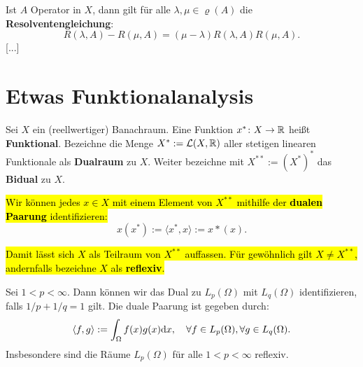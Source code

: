 \begin{bem}
Ist $A$ Operator in $X$, dann gilt für alle $\lambda,\mu\in \varrho(A)$ die \textbf{Resolventengleichung}:
\begin{equation*}
R(\lambda, A)-R(\mu, A)=(\mu-\lambda)R(\lambda, A) R(\mu, A).
\end{equation*}
[...]
\end{bem}



\section{Etwas Funktionalanalysis}




\begin{defi}
Sei $X$ ein (reellwertiger) Banachraum. Eine Funktion $x^*\colon X\to \mathbb{R}$ heißt \textbf{Funktional}. Bezeichne die Menge $X^*:=\mathcal L(X,\mathbb{R})$ aller stetigen linearen Funktionale als  \textbf{Dualraum} zu $X$. Weiter bezeichne mit $X^{**}:=(X^*)^*$ das \textbf{Bidual} zu $X$. 
\par
\hl{Wir können jedes $x\in X$ mit einem Element von  $X^{**}$ mithilfe der \textbf{dualen Paarung} identifizieren:}
\begin{equation*}
x(x^*):=\langle x^*, x\rangle := x*(x).
\end{equation*}
\par
\hl{Damit lässt sich $X$ als Teilraum von $X^{**}$ auffassen. Für gewöhnlich gilt $X\neq X^{**}$, andernfalls bezeichne $X$ als \textbf{reflexiv}.}
\end{defi}

\begin{bsp}
Sei $1<p<\infty$. Dann können wir das Dual zu $L_p(\Omega)$ mit $L_q(\Omega)$ identifizieren, falls $1/p + 1/q = 1$ gilt. Die duale Paarung ist gegeben durch:
\begin{equation*}
\langle f,g\rangle :=\int_\Omega f(x)g(x)\text dx,\quad\forall f\in L_p(\Omega),\forall g\in L_q(\Omega).
\end{equation*}
Insbesondere sind die Räume $L_p(\Omega)$ für alle $1<p<\infty$ reflexiv. 
\end{bsp}

